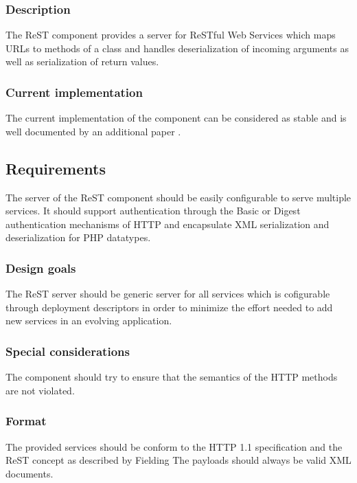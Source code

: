 \documentclass[10pt,final,a4paper,oneside]{article}
\begin{document}
\subsubsection{Description}
The ReST component provides a server for
ReSTful Web Services which maps URLs
to methods of a class and handles
deserialization of incoming arguments
as well as serialization of return values.


\subsubsection{Current implementation}
The current implementation of the component
can be considered as stable and is
well documented by an additional paper \cite{ReSTpaper}.

\subsection{Requirements}\label{subsec:ReSTRequirements}
The server of the ReST component 
should be easily configurable to serve multiple services.
It should support authentication through
the Basic or Digest authentication mechanisms of HTTP
and encapsulate XML serialization and deserialization
for PHP datatypes.

\subsubsection{Design goals}
The ReST server should be generic server for all services
which is cofigurable through deployment descriptors
in order to minimize the effort needed to add
new services in an evolving application.

\subsubsection{Special considerations}
The component should try to ensure that the
semantics of the HTTP methods
are not violated.

\subsubsection{Format}
The provided services should be conform to the
HTTP 1.1 specification and the ReST concept
as described by  Fielding %
The payloads should always be valid XML documents.
\end{document}
